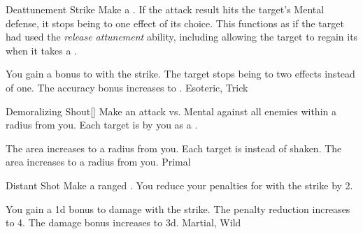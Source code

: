 \lowercase{\hypertarget{maneuver:Deattunement Strike}{}}\label{maneuver:Deattunement Strike}
\hypertarget{maneuver:Deattunement Strike}{}
\begin{freeability}{Deattunement Strike}
Make a .
If the attack result hits the target's Mental defense,
it stops being  to one effect of its choice.
This functions as if the target had used the \textit{release attunement} ability,
including allowing the target to regain its  when it takes a .

\rankline
{} You gain a  bonus to  with the strike.
 The target stops being  to two effects instead of one.
 The accuracy bonus increases to .
 Esoteric, Trick
\end{freeability}
\vspace{0.25em}



\lowercase{\hypertarget{maneuver:Demoralizing Shout}{}}\label{maneuver:Demoralizing Shout}
\hypertarget{maneuver:Demoralizing Shout}{}
\begin{freeability}{Demoralizing Shout}[]
Make an attack vs. Mental against all enemies within a \areasmall radius from you.
\hit Each target is  by you as a .

\rankline
{} The area increases to a \areamed radius from you.
 Each target is  instead of shaken.
 The area increases to a \areahuge radius from you.
 Primal
\end{freeability}
\vspace{0.25em}



\lowercase{\hypertarget{maneuver:Distant Shot}{}}\label{maneuver:Distant Shot}
\hypertarget{maneuver:Distant Shot}{}
\begin{freeability}{Distant Shot}
Make a ranged .
You reduce your penalties for  with the strike by 2.

\rankline
{} You gain a \plus1d bonus to damage with the strike.
 The penalty reduction increases to 4.
 The damage bonus increases to \plus3d.
 Martial, Wild
\end{freeability}
\vspace{0.25em}



